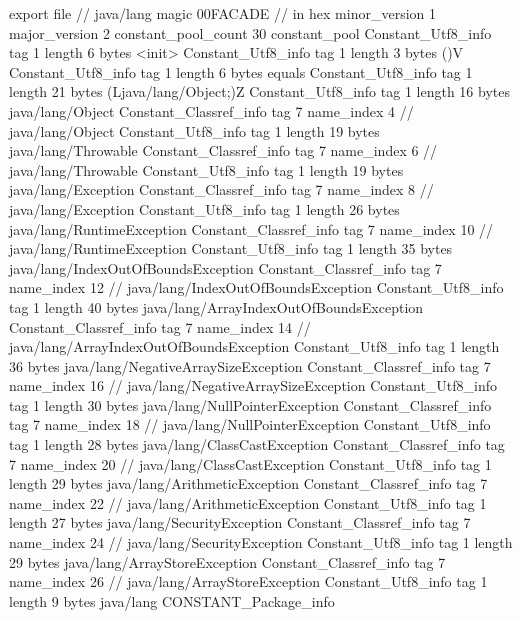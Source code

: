 export file {		// java/lang
	magic	00FACADE		 // in hex
	minor_version	1
	major_version	2
	constant_pool_count	30
	constant_pool {
		Constant_Utf8_info {
			tag	1
			length	6
			bytes	<init>
		}
		Constant_Utf8_info {
			tag	1
			length	3
			bytes	()V
		}
		Constant_Utf8_info {
			tag	1
			length	6
			bytes	equals
		}
		Constant_Utf8_info {
			tag	1
			length	21
			bytes	(Ljava/lang/Object;)Z
		}
		Constant_Utf8_info {
			tag	1
			length	16
			bytes	java/lang/Object
		}
		Constant_Classref_info {
			tag	7
			name_index	4		// java/lang/Object
		}
		Constant_Utf8_info {
			tag	1
			length	19
			bytes	java/lang/Throwable
		}
		Constant_Classref_info {
			tag	7
			name_index	6		// java/lang/Throwable
		}
		Constant_Utf8_info {
			tag	1
			length	19
			bytes	java/lang/Exception
		}
		Constant_Classref_info {
			tag	7
			name_index	8		// java/lang/Exception
		}
		Constant_Utf8_info {
			tag	1
			length	26
			bytes	java/lang/RuntimeException
		}
		Constant_Classref_info {
			tag	7
			name_index	10		// java/lang/RuntimeException
		}
		Constant_Utf8_info {
			tag	1
			length	35
			bytes	java/lang/IndexOutOfBoundsException
		}
		Constant_Classref_info {
			tag	7
			name_index	12		// java/lang/IndexOutOfBoundsException
		}
		Constant_Utf8_info {
			tag	1
			length	40
			bytes	java/lang/ArrayIndexOutOfBoundsException
		}
		Constant_Classref_info {
			tag	7
			name_index	14		// java/lang/ArrayIndexOutOfBoundsException
		}
		Constant_Utf8_info {
			tag	1
			length	36
			bytes	java/lang/NegativeArraySizeException
		}
		Constant_Classref_info {
			tag	7
			name_index	16		// java/lang/NegativeArraySizeException
		}
		Constant_Utf8_info {
			tag	1
			length	30
			bytes	java/lang/NullPointerException
		}
		Constant_Classref_info {
			tag	7
			name_index	18		// java/lang/NullPointerException
		}
		Constant_Utf8_info {
			tag	1
			length	28
			bytes	java/lang/ClassCastException
		}
		Constant_Classref_info {
			tag	7
			name_index	20		// java/lang/ClassCastException
		}
		Constant_Utf8_info {
			tag	1
			length	29
			bytes	java/lang/ArithmeticException
		}
		Constant_Classref_info {
			tag	7
			name_index	22		// java/lang/ArithmeticException
		}
		Constant_Utf8_info {
			tag	1
			length	27
			bytes	java/lang/SecurityException
		}
		Constant_Classref_info {
			tag	7
			name_index	24		// java/lang/SecurityException
		}
		Constant_Utf8_info {
			tag	1
			length	29
			bytes	java/lang/ArrayStoreException
		}
		Constant_Classref_info {
			tag	7
			name_index	26		// java/lang/ArrayStoreException
		}
		Constant_Utf8_info {
			tag	1
			length	9
			bytes	java/lang
		}
		CONSTANT_Package_info {
}}}
